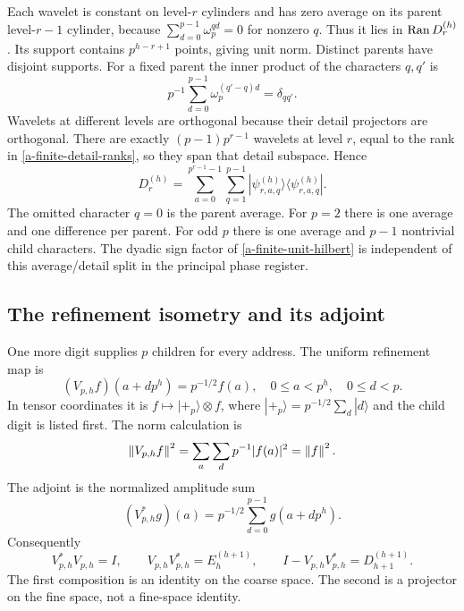 Each wavelet is constant on level-$r$ cylinders and has zero average
on its parent level-$r-1$ cylinder, because
$\sum_{d=0}^{p-1}\omega_p^{qd}=0$ for nonzero $q$. Thus it lies in
$\operatorname{Ran} D_r^{(h)}$. Its support contains $p^{h-r+1}$ points, giving
unit norm. Distinct parents have disjoint supports. For a fixed parent
the inner product of the characters $q,q'$ is
\[
 p^{-1}\sum_{d=0}^{p-1}\omega_p^{(q'-q)d}=\delta_{qq'}.
\]
Wavelets at different levels are orthogonal because their detail
projectors are orthogonal. There are exactly
$(p-1)p^{r-1}$ wavelets at level $r$, equal to the rank in
\eqref{a-finite-detail-ranks}, so they span that detail subspace. Hence
\begin{equation}
 D_r^{(h)}=\sum_{a=0}^{p^{r-1}-1}\sum_{q=1}^{p-1}
       |\psi_{r,a,q}^{(h)}\rangle\langle\psi_{r,a,q}^{(h)}|.
 \label{a-finite-wavelet-projector}
\end{equation}
The omitted character $q=0$ is the parent average. For $p=2$ there is
one average and one difference per parent. For odd $p$ there is one
average and $p-1$ nontrivial child characters. The dyadic sign factor of
\eqref{a-finite-unit-hilbert} is independent of this average/detail
split in the principal phase register.




\subsection{The refinement isometry and its adjoint}

One more digit supplies $p$ children for every address. The uniform
refinement map is
\begin{equation}
 (V_{p,h}f)(a+d p^h)=p^{-1/2}f(a),
 \quad 0\leq a<p^h,\quad0\leq d<p.
 \label{a-finite-refinement}
\end{equation}
In tensor coordinates it is $f\mapsto|+_p\rangle\otimes f$,
where $|+_p\rangle=p^{-1/2}\sum_d|d\rangle$ and the child digit is
listed first. The norm calculation is
\[
 \left\lVert V_{p,h}f\right\rVert^2=\sum_a\sum_d p^{-1}|f(a)|^2=\left\lVert f\right\rVert^2.
\]
The adjoint is the normalized amplitude sum
\begin{equation}
 (V_{p,h}^*g)(a)=p^{-1/2}\sum_{d=0}^{p-1}g(a+d p^h).
 \label{a-finite-refinement-adjoint}
\end{equation}
Consequently
\begin{equation}
 V_{p,h}^*V_{p,h}=I,\qquad
 V_{p,h}V_{p,h}^*=E_h^{(h+1)},\qquad
 I-V_{p,h}V_{p,h}^*=D_{h+1}^{(h+1)}.
 \label{a-finite-refinement-projectors}
\end{equation}
The first composition is an identity on the coarse space. The second
is a projector on the fine space, not a fine-space identity.

